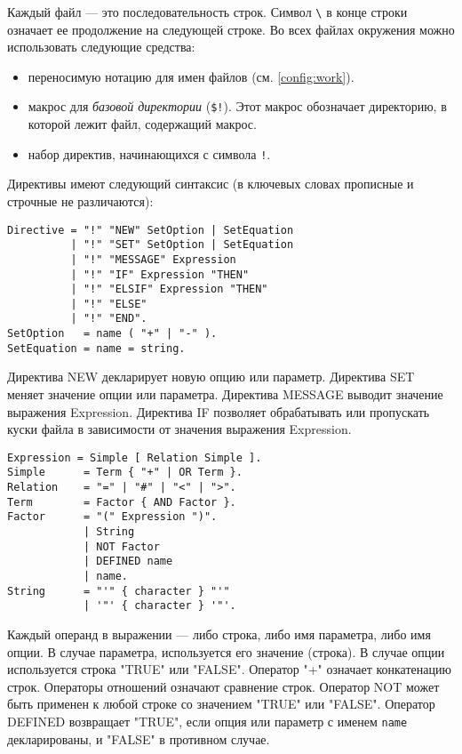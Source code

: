 Каждый файл --- это последовательность строк.
Символ \verb|\| в конце строки означает ее продолжение на следующей
строке.
Во всех файлах окружения можно использовать следующие средства:
\begin{itemize}
\item переносимую нотацию для имен файлов (см. \ref{config:work}).
\item макрос для {\em базовой директории} (\verb|$!|). %
      Этот макрос обозначает директорию, в которой лежит файл, содержащий
      макрос.
\item набор директив, начинающихся с символа \verb|!|.
\end{itemize}
Директивы имеют следующий синтаксис (в ключевых словах прописные 
и строчные не различаются):
\begin{verbatim}
Directive = "!" "NEW" SetOption | SetEquation
          | "!" "SET" SetOption | SetEquation
          | "!" "MESSAGE" Expression
          | "!" "IF" Expression "THEN"
          | "!" "ELSIF" Expression "THEN"
          | "!" "ELSE"
          | "!" "END".
SetOption   = name ( "+" | "-" ).
SetEquation = name = string.
\end{verbatim}

Директива NEW декларирует новую опцию или параметр. Директива 
SET меняет значение опции или параметра.
Директива MESSAGE выводит значение выражения Expression.
Директива IF позволяет обрабатывать или пропускать куски файла
в зависимости от значения выражения Expression.

\begin{verbatim}
Expression = Simple [ Relation Simple ].
Simple      = Term { "+" | OR Term }.
Relation    = "=" | "#" | "<" | ">".
Term        = Factor { AND Factor }.
Factor      = "(" Expression ")".
            | String
            | NOT Factor
            | DEFINED name
            | name.
String      = "'" { character } "'"
            | '"' { character } '"'.
\end{verbatim}

Каждый операнд в выражении --- либо строка, либо имя параметра, либо
имя опции.
В случае параметра, используется его значение (строка).
В случае опции используется строка
"TRUE" или "FALSE". 
Оператор "+" означает конкатенацию строк. Операторы отношений означают
сравнение строк.
Оператор NOT может быть применен к любой строке со значением
"TRUE" или "FALSE". Оператор DEFINED возвращает "TRUE", если
опция или параметр с именем {\tt name} декларированы, и "FALSE"
в противном случае.

